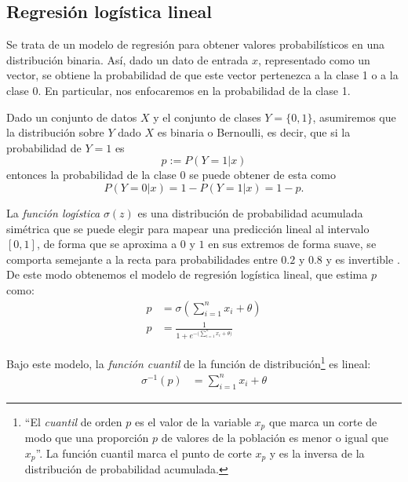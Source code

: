\subsection{Regresión logística lineal}

Se trata de un modelo de regresión para obtener valores probabilísticos en una distribución binaria. Así, dado un dato de entrada $x$, representado como un vector, se obtiene la probabilidad de que este vector pertenezca a la clase 1 o a la clase 0. En particular, nos enfocaremos en la probabilidad de la clase 1.

Dado un conjunto de datos $X$ y el conjunto de clases $Y = \{0,1\}$, asumiremos que la distribución sobre $Y$ dado $X$ es binaria o Bernoulli, es decir, que si la probabilidad de $Y=1$ es $$p := P(Y=1|x)$$ entonces la probabilidad de la clase 0 se puede obtener de esta como $$P(Y=0|x) = 1-P(Y=1|x) = 1-p.$$




La \emph{función logística} $\sigma(z)$ es una distribución de probabilidad acumulada simétrica que se puede elegir para mapear una predicción lineal al intervalo $[0,1]$, de forma que se aproxima a $0$ y $1$ en sus extremos de forma suave, se comporta semejante a la recta para probabilidades entre $0.2$ y $0.8$ y es invertible \parencite{Fox2016}.  De este modo obtenemos el modelo de regresión logística lineal, que estima $p$ como:
\begin{align*}
 p &= \sigma \left(\sum_{i=1}^n x_i + \theta \right) \\
 p &= \frac{1}{1 + e^{-\big(\sum_{i=1}^n x_i + \theta\big)}}
\end{align*}

Bajo este modelo, la \emph{función cuantil} de la función de distribución\footnote{``El \textit{cuantil} de orden $p$ es el valor de la variable $x_p$ que marca un corte de modo que una proporción $p$ de valores de la población es menor o igual que $x_{p}$''.  La función cuantil marca el punto de corte $x_p$ y es la inversa de la distribución de probabilidad acumulada. } es lineal:
\begin{align}
 \sigma^{-1}(p) &= \sum_{i=1}^n x_i + \theta \label{eq:cuantil}
\end{align}

